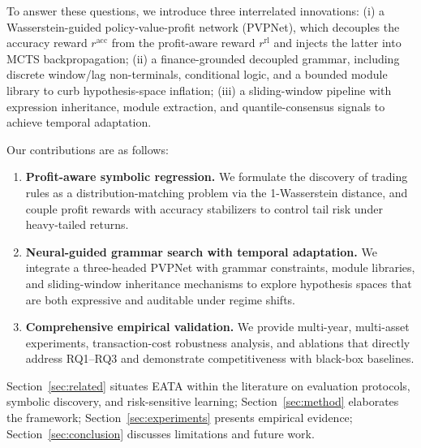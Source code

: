 To answer these questions, we introduce three interrelated innovations: (i) a Wasserstein-guided policy-value-profit network (PVPNet), which decouples the accuracy reward $r^{\text{acc}}$ from the profit-aware reward $r^{\text{rl}}$ and injects the latter into MCTS backpropagation; (ii) a finance-grounded decoupled grammar, including discrete window/lag non-terminals, conditional logic, and a bounded module library to curb hypothesis-space inflation; (iii) a sliding-window pipeline with expression inheritance, module extraction, and quantile-consensus signals to achieve temporal adaptation.


Our contributions are as follows:
\begin{enumerate}
    \item \textbf{Profit-aware symbolic regression.} We formulate the discovery of trading rules as a distribution-matching problem via the 1-Wasserstein distance, and couple profit rewards with accuracy stabilizers to control tail risk under heavy-tailed returns.
    \item \textbf{Neural-guided grammar search with temporal adaptation.} We integrate a three-headed PVPNet with grammar constraints, module libraries, and sliding-window inheritance mechanisms to explore hypothesis spaces that are both expressive and auditable under regime shifts.
    \item \textbf{Comprehensive empirical validation.} We provide multi-year, multi-asset experiments, transaction-cost robustness analysis, and ablations that directly address RQ1--RQ3 and demonstrate competitiveness with black-box baselines.
\end{enumerate}


Section~\ref{sec:related} situates EATA within the literature on evaluation protocols, symbolic discovery, and risk-sensitive learning; Section~\ref{sec:method} elaborates the framework; Section~\ref{sec:experiments} presents empirical evidence; Section~\ref{sec:conclusion} discusses limitations and future work.
